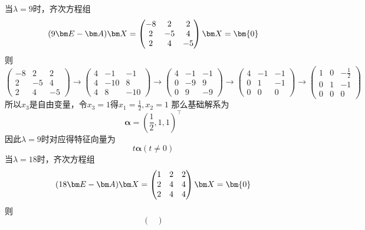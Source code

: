\begin{solution}
    当$\lambda=9$时，齐次方程组
    \[
        (9\mat{E} - \mat{A})\mat{X} =
        \begin{pmatrix}
            -8 & 2  & 2  \\
            2  & -5 & 4  \\
            2  & 4  & -5
        \end{pmatrix}\mat{X}
        =\bm{0}
    \]
    则
    \[
        \begin{pmatrix}
            -8 & 2  & 2  \\
            2  & -5 & 4  \\
            2  & 4  & -5
        \end{pmatrix}
        \longrightarrow
        \begin{pmatrix}
            4 & -1  & -1  \\
            4 & -10 & 8   \\
            4 & 8   & -10
        \end{pmatrix}
        \longrightarrow
        \begin{pmatrix}
            4 & -1 & -1 \\
            0 & -9 & 9  \\
            0 & 9  & -9
        \end{pmatrix}
        \longrightarrow
        \begin{pmatrix}
            4 & -1 & -1 \\
            0 & 1  & -1 \\
            0 & 0  & 0
        \end{pmatrix}
        \longrightarrow
        \begin{pmatrix}
            1 & 0 & -\frac{1}{2} \\
            0 & 1 & -1           \\
            0 & 0 & 0
        \end{pmatrix}
    \]
    所以$x_3$是自由变量，令$x_3=1$得$x_1=\frac{1}{2},x_2=1$
    那么基础解系为
    \[
        \bm{\alpha} = (\frac{1}{2},1,1)^\intercal
    \]
    因此$\lambda = 9$时对应得特征向量为
    \[ t\bm{\alpha} (t\neq 0) \]
    当$\lambda=18$时，齐次方程组
    \[
        (18\mat{E} - \mat{A})\mat{X} =
        \begin{pmatrix}
            1 & 2 & 2 \\
            2 & 4 & 4 \\
            2 & 4 & 4
        \end{pmatrix}\mat{X}
        =\bm{0}
    \]
    则
    \[
        \begin{pmatrix}

\end{pmatrix}\]
\end{solution}
